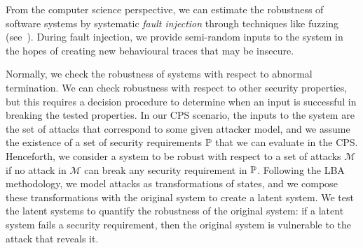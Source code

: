 {From the computer science perspective, we can estimate the robustness of software systems by systematic \emph{fault injection} through techniques like fuzzing (see~\cite{Fuzzing}).  
During fault injection, we provide semi-random inputs to the system in the hopes of creating new behavioural traces that may be insecure.

Normally, we check the robustness of systems with respect to abnormal termination. We can check robustness with respect to other security properties, but this requires a decision procedure to determine when an input is successful in breaking the tested properties. In our CPS scenario, the inputs to the system are the set of attacks that correspond to some given attacker model, and we assume the existence of a set of security requirements $\mathbb{P}$ that we can evaluate in the CPS. Henceforth, we consider a system to be robust with respect to a set of attacks $\mathcal{M}$ if no attack in $\mathcal{M}$ can break any security requirement in $\mathbb{P}$. Following the LBA methodology, we model attacks as transformations of states, and we compose these transformations with the original system to create a latent system. We test the latent systems to quantify the robustness of the original system: if a latent system fails a security requirement, then the original system is vulnerable to the attack that reveals it. 

}
